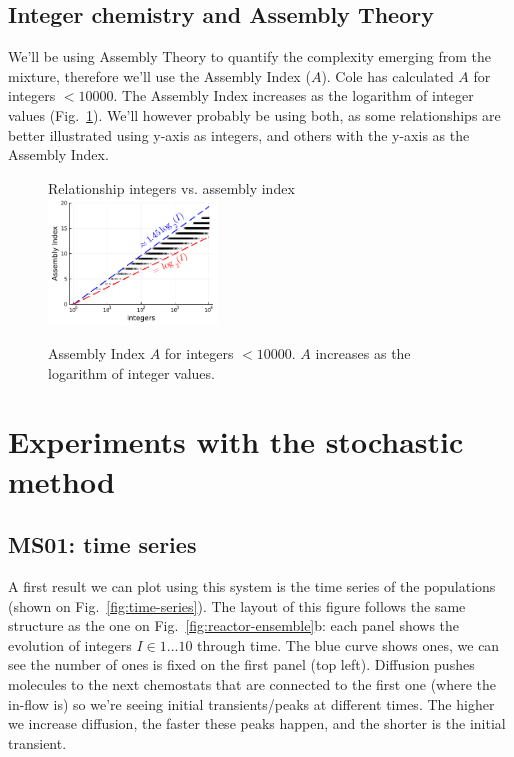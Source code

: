 \documentclass[11pt]{article}
\begin{document}
\subsection{Integer chemistry and Assembly Theory}
\label{subsec:integer-chemistry}

We’ll be using Assembly Theory to quantify the complexity emerging from the mixture, therefore we’ll use the Assembly Index ($A$). Cole has calculated $A$ for integers $<10000$. The Assembly Index increases as the logarithm of integer values (Fig.~\ref{fig:integers-assembly}). We’ll however probably be using both, as some relationships are better illustrated using y-axis as integers, and others with the y-axis as the Assembly Index.

\begin{figure}[hbt]
  \centering
  {\LARGE Relationship integers vs. assembly index}\vspace{1em}\\
  \includegraphics[width=0.40\textwidth]{figures/system/integers-assembly.pdf}
  \caption{Assembly Index $A$ for integers $<10000$. $A$ increases as the logarithm of integer values.}
  \label{fig:integers-assembly}
\end{figure}

\clearpage

\section{Experiments with the stochastic method}
\label{sec:experiments}

\subsection{MS01: time series}
\label{subsec:MS01}

A first result we can plot using this system is the time series of the populations (shown on Fig.~\ref{fig:time-series}). The layout of this figure follows the same structure as the one on Fig.~\ref{fig:reactor-ensemble}b: each panel shows the evolution of integers $I\in{1...10}$ through time. The blue curve shows ones, we can see the number of ones is fixed on the first panel (top left). Diffusion pushes molecules to the next chemostats that are connected to the first one (where the in-flow is) so we’re seeing initial transients/peaks at different times. The higher we increase diffusion, the faster these peaks happen, and the shorter is the initial transient.
\end{document}
